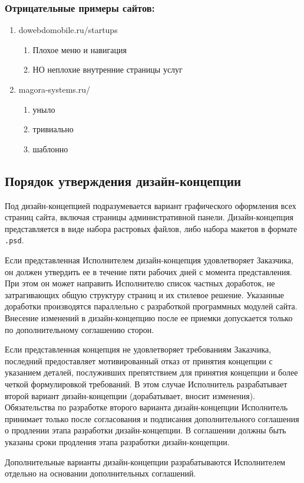\subsubsection{Отрицательные примеры сайтов:}
\begin{enumerate}
  \item dowebdomobile.ru/startups
  \begin{enumerate}
    \item Плохое меню и навигация
    \item НО неплохие внутренние страницы услуг
  \end{enumerate}

  \item magora-systems.ru/
  \begin{enumerate}
    \item уныло
    \item тривиально
    \item шаблонно
  \end{enumerate}
\end{enumerate}

\subsection{Порядок утверждения дизайн-концепции}
Под дизайн-концепцией подразумевается вариант графического оформления всех страниц сайта, включая страницы административной панели. Дизайн-концепция представляется в виде набора растровых файлов, либо набора макетов в формате \texttt{.psd}.

Если представленная Исполнителем дизайн-концепция удовлетворяет Заказчика, он должен утвердить ее в течение пяти рабочих дней с момента представления. При этом он может направить Исполнителю список частных доработок, не затрагивающих общую структуру страниц и их стилевое решение. Указанные доработки производятся параллельно с разработкой программных модулей сайта. Внесение изменений в дизайн-концепцию после ее приемки допускается только по дополнительному соглашению сторон.

Если представленная концепция не удовлетворяет требованиям Заказчика, последний предоставляет мотивированный отказ от принятия концепции с указанием деталей, послуживших препятствием для принятия концепции и более четкой формулировкой требований. В этом случае Исполнитель разрабатывает второй вариант дизайн-концепции (дорабатывает, вносит изменения). Обязательства по разработке второго варианта дизайн-концепции Исполнитель принимает только после согласования и подписания дополнительного соглашения о продлении этапа разработки дизайн-концепции. В соглашении должны быть указаны сроки продления этапа разработки дизайн-концепции.

Дополнительные варианты дизайн-концепции разрабатываются Исполнителем отдельно на основании дополнительных соглашений.
